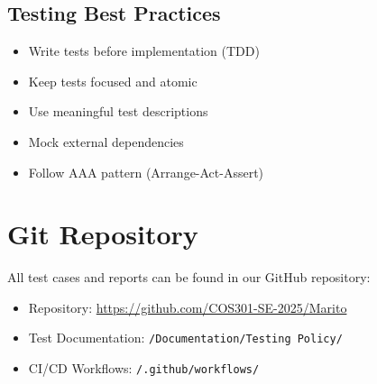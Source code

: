\documentclass[12pt]{article}
\begin{document}
\subsection{Testing Best Practices}
\begin{itemize}
    \item Write tests before implementation (TDD)
    \item Keep tests focused and atomic
    \item Use meaningful test descriptions
    \item Mock external dependencies
    \item Follow AAA pattern (Arrange-Act-Assert)
\end{itemize}

\section{Git Repository}
All test cases and reports can be found in our GitHub repository:
\begin{itemize}
    \item Repository: \url{https://github.com/COS301-SE-2025/Marito}
    \item Test Documentation: \texttt{/Documentation/Testing Policy/}
    \item CI/CD Workflows: \texttt{/.github/workflows/}
\end{itemize}
\end{document}
